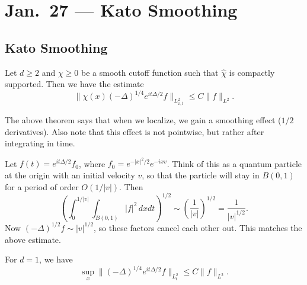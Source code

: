 \chapter{Jan.~27 --- Kato Smoothing}

\section{Kato Smoothing}

\begin{theorem}\label{thm:kato-smoothing}
  Let $d \ge 2$ and $\chi \ge 0$ be a smooth
  cutoff function such that $\widehat{\chi}$ is
  compactly supported. Then we have the estimate
  \[
    \|\chi(x) (-\Delta)^{1 / 4} e^{i t \Delta / 2} f\|_{L^2_{x, t}} \le C\|f\|_{L^2}.
  \]
\end{theorem}

\begin{remark}
  The above theorem says that when we localize, we
  gain a smoothing effect ($1 / 2$ derivatives).
  Also note that this effect is not pointwise, but rather
  after integrating in time.
\end{remark}

\begin{remark}
  Let $f(t) = e^{it \Delta / 2} f_0$, where
  $f_0 = e^{-|x|^2 / 2} e^{-ix v}$. Think of this
  as a quantum particle at the origin with an initial
  velocity $v$, so
  that the particle will stay in
  $B(0, 1)$ for a period of order $O(1 / |v|)$. Then
  \[
    \left(\int_0^{1 / |v|} \int_{B(0, 1)} |f|^2\, dx dt\right)^{1 / 2}
    \sim \left(\frac{1}{|v|}\right)^{1 / 2}
    = \frac{1}{|v|^{1 / 2}}.
  \]
  Now $(-\Delta)^{1 / 2} f \sim |v|^{1 / 2}$, so these
  factors cancel each other out.
  This matches the above estimate.
\end{remark}

\begin{theorem}
  For $d = 1$, we have
  \[
    \sup_x \|(-\Delta)^{1 / 4} e^{it \Delta / 2} f\|_{L^2_t}
    \le C \|f\|_{L^2}.
  \]
\end{theorem}

